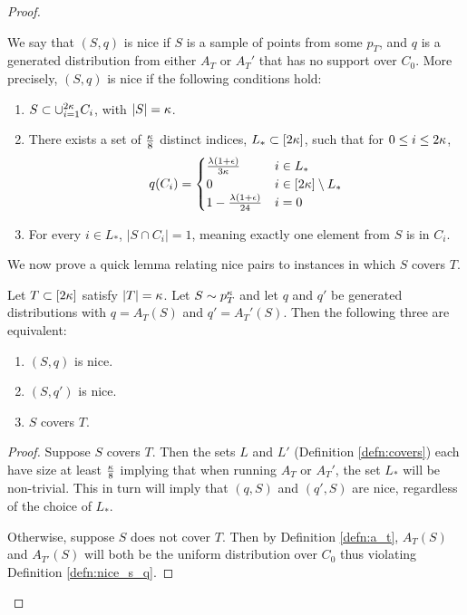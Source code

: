 \begin{proof}
\begin{definition}\label{defn:nice_s_q}
We say that $(S, q)$ is nice if $S$ is a sample of points from some $p_T$, and $q$ is a generated distribution from either $A_T$ or $A_T'$ that has no support over $C_0$. More precisely, $(S,q)$ is nice if the following conditions hold:
\begin{enumerate}
	\item $S \subset \cup_{i = 1}^{2\kappa} C_i$, with $|S| = \kappa$.
	\item There exists a set of  $\frac{\kappa}{8}$ distinct indices, $L_* \subset [2\kappa]$, such that for $0 \leq i \leq 2\kappa$, $$q(C_i) = \begin{cases} \frac{\lambda(1+\epsilon)}{3\kappa} & i \in L_* \\ 0 & i \in [2\kappa] \setminus L_* \\ 1 - \frac{\lambda (1 + \epsilon)}{24}  & i = 0 \end{cases}$$
	\item For every $i \in L_*$, $|S \cap C_i| = 1$, meaning exactly one element from $S$ is in $C_i$. 
\end{enumerate}
\end{definition}

We now prove a quick lemma relating nice pairs to instances in which $S$ covers $T$.

\begin{lemma}\label{lem:nice_vs_cover}
Let $T \subset [2\kappa]$ satisfy $|T| = \kappa$. Let $S \sim p_T^\kappa$ and let $q$ and $q'$ be generated distributions with $q = A_T(S)$ and $q' = A_T'(S)$. Then the following three are equivalent:
\begin{enumerate}
	\item $(S, q)$ is nice.
	\item $(S, q')$ is nice.
	\item $S$ covers $T$.
\end{enumerate}
\end{lemma} 

\begin{proof}
Suppose $S$ covers $T$. Then the sets $L$ and $L'$ (Definition \ref{defn:covers}) each have size at least $\frac{\kappa}{8}$ implying that when running $A_T$ or $A_T'$, the set $L_*$ will be non-trivial. This in turn will imply that $(q, S)$ and $(q', S)$ are nice, regardless of the choice of $L_*$.

Otherwise, suppose $S$ does not cover $T$. Then by Definition \ref{defn:a_t}, $A_T(S)$ and $A_{T'}(S)$ will both be the uniform distribution over $C_0$ thus violating Definition \ref{defn:nice_s_q}. 
\end{proof}


\end{proof}
